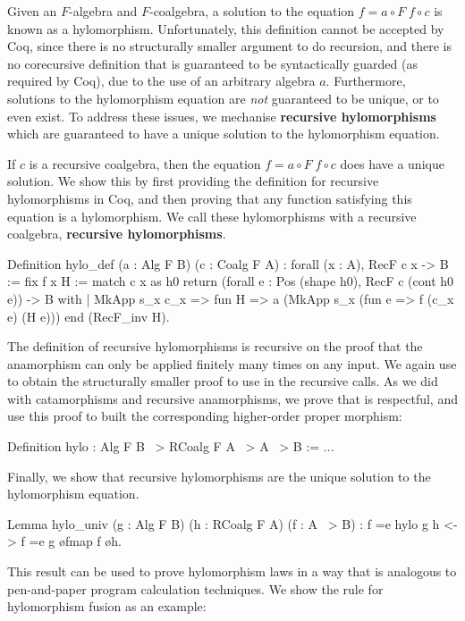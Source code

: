 \documentclass[anonymous, a4paper, UKenglish, cleveref, autoref, thm-restate]{lipics-v2021}
\begin{document}
Given an $F$-algebra and $F$-coalgebra, a solution to the equation
$f = a \circ F\; f \circ c$ is known as a hylomorphism. Unfortunately, this
definition cannot be accepted by Coq, since there is no structurally smaller
argument to do recursion, and there is no corecursive definition that is
guaranteed to be syntactically guarded (as required by Coq), due to the use of
an arbitrary algebra $a$. Furthermore, solutions to the hylomorphism equation
are \emph{not} guaranteed to be unique, or to even exist. To address these
issues, we mechanise \textbf{recursive hylomorphisms} which are guaranteed to
have a unique solution to the hylomorphism equation.

If $c$ is a recursive coalgebra, then the equation $f = a \circ F\; f \circ c$
does have a unique solution.  We show this by first providing the definition for
recursive hylomorphisms in Coq, and then proving that any function satisfying
this equation is a hylomorphism. We call these hylomorphisms with a recursive
coalgebra, \textbf{recursive hylomorphisms}.
\begin{coqcode}
Definition hylo_def (a : Alg F B) (c : Coalg F A)
  : forall (x : A), RecF c x -> B := fix f x H
  := match c x as h0 return
       (forall e : Pos (shape h0), RecF c (cont h0 e)) -> B
     with
     | MkApp s_x c_x => fun H => a (MkApp s_x (fun e => f (c_x e) (H e)))
     end (RecF_inv H).
\end{coqcode}
The definition of recursive hylomorphisms is recursive on the proof that the
anamorphism can only be applied finitely many times on any input. We again use
 to obtain the structurally smaller proof to use in
the recursive calls.  As we did with catamorphisms and recursive anamorphisms,
we prove that  is respectful, and use this proof to
built the corresponding higher-order proper morphism:
\begin{coqcode}
Definition hylo : Alg F B ~> RCoalg F A ~> A ~> B := ...
\end{coqcode}
Finally, we show that recursive hylomorphisms are the unique solution to
the hylomorphism equation.
\begin{coqcode}
Lemma hylo_univ (g : Alg F B) (h : RCoalg F A) (f : A ~> B)
    : f =e hylo g h <-> f =e g \o fmap f \o h.
\end{coqcode}
This result can be used to prove hylomorphism laws in a way that is analogous
to pen-and-paper program calculation techniques. We show the rule for
hylomorphism fusion as an example:
\end{document}
